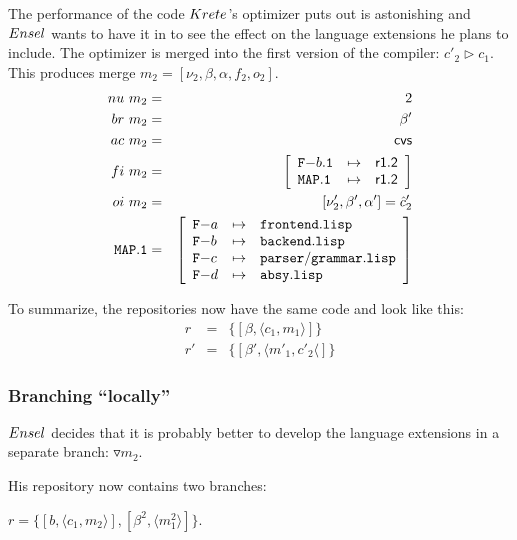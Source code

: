 \documentclass[fleqn, 10pt, a4paper]{report}
\begin{document}
The performance of the code $\mathnormal{Krete}$'s optimizer puts out is
astonishing and $\mathnormal{Ensel}$ wants to have it in to see the effect
on the language extensions he plans to include. The optimizer is
merged into the first version of the compiler: $c'_2 \rhd c_1$. This
produces merge $m_2=[\nu_2, \beta, \alpha, f_2, o_2]$.
\begin{eqnarray*}
\mathnormal{nu}\ m_2 &=& 2 \\
\mathnormal{br}\ m_2 &=& \beta' \\
\mathnormal{ac}\ m_2 &=& \mathsf{cvs} \\
\mathnormal{fi}\ m_2 &=& \left[
\begin{array}{lcl}
\mathtt{F-}b\mathtt{.1} & \mapsto & \mathsf{r1.2} \\
\mathtt{MAP.1}         & \mapsto & \mathsf{r1.2} \\
\end{array}\right] \\
\mathnormal{oi}\ m_2 &=& [\nu'_2, \beta', \alpha'] = \hat c'_2 \\
\mathtt{MAP.1} &=& \left[
\begin{array}{lcl}
\mathtt{F-}a &\mapsto& \mathtt{frontend.lisp} \\
\mathtt{F-}b &\mapsto& \mathtt{backend.lisp} \\
\mathtt{F-}c &\mapsto& \mathtt{parser/grammar.lisp} \\
\mathtt{F-}d &\mapsto& \mathtt{absy.lisp} \\
\end{array}\right]
\end{eqnarray*}

\medskip
To summarize, the repositories now have the same code and look like this:
\begin{eqnarray*}
r  &=& \{[\beta, \langle c_1, m_1\rangle]\} \\
r' &=& \{[\beta', \langle m'_1, c'_2\langle]\}
\end{eqnarray*}

\subsubsection{Branching ``locally''}

$\mathnormal{Ensel}$ decides that it is probably better to develop
the language extensions in a separate branch: $\triangledown m_2$.

His repository now contains two branches:

$r=\{[b, \langle c_1, m_2\rangle], [\beta^2, \langle m_1^2 \rangle]\}$.
\end{document}
